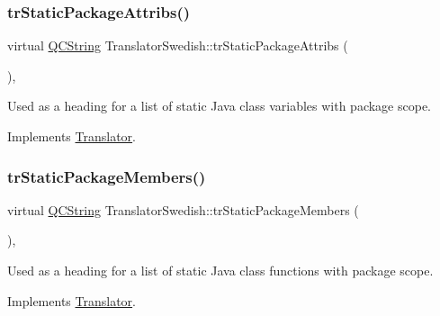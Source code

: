 \mbox{\label{class_translator_swedish_af91061f2063f7805a2f9bdce846cc4bf}} 
\subsubsection{\texorpdfstring{trStaticPackageAttribs()}{trStaticPackageAttribs()}}
{\footnotesize\ttfamily virtual \mbox{\hyperlink{class_q_c_string}{Q\+C\+String}} Translator\+Swedish\+::tr\+Static\+Package\+Attribs (\begin{DoxyParamCaption}{ }\end{DoxyParamCaption})\hspace{0.3cm}{\ttfamily [inline]}, {\ttfamily [virtual]}}

Used as a heading for a list of static Java class variables with package scope. 

Implements \mbox{\hyperlink{class_translator}{Translator}}.

\mbox{\label{class_translator_swedish_a2eb198374036b980a74698f935f20d5c}} 
\subsubsection{\texorpdfstring{trStaticPackageMembers()}{trStaticPackageMembers()}}
{\footnotesize\ttfamily virtual \mbox{\hyperlink{class_q_c_string}{Q\+C\+String}} Translator\+Swedish\+::tr\+Static\+Package\+Members (\begin{DoxyParamCaption}{ }\end{DoxyParamCaption})\hspace{0.3cm}{\ttfamily [inline]}, {\ttfamily [virtual]}}

Used as a heading for a list of static Java class functions with package scope. 

Implements \mbox{\hyperlink{class_translator}{Translator}}.

\mbox{\label{class_translator_swedish_a1dccde975433a816c2fc9230312b13b0}} 
